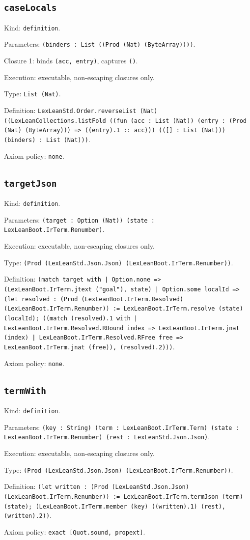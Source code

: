 \documentclass[11pt]{article}
\begin{document}
\subsection*{\texttt{caseLocals}}
\noindent Kind: \texttt{definition}.\par
\noindent Parameters: \texttt{(binders : List ((Prod (Nat) (ByteArray))))}.\par
\noindent Closure 1: binds \texttt{(acc, entry)}, captures \texttt{()}.\par
\noindent Execution: executable, non-escaping closures only.\par
\noindent Type: \texttt{List (Nat)}.\par
\noindent Definition: \texttt{LexLeanStd.Order.reverseList (Nat) ((LexLeanCollections.listFold ((fun (acc : List (Nat)) (entry : (Prod (Nat) (ByteArray))) => ((entry).1 :: acc))) (([] : List (Nat))) (binders) : List (Nat)))}.\par
\noindent Axiom policy: \texttt{none}.\par
\subsection*{\texttt{targetJson}}
\noindent Kind: \texttt{definition}.\par
\noindent Parameters: \texttt{(target : Option (Nat)) (state : LexLeanBoot.IrTerm.Renumber)}.\par
\noindent Execution: executable, non-escaping closures only.\par
\noindent Type: \texttt{(Prod (LexLeanStd.Json.Json) (LexLeanBoot.IrTerm.Renumber))}.\par
\noindent Definition: \texttt{(match target with | Option.none => (LexLeanBoot.IrTerm.jtext ("goal"), state) | Option.some localId => (let resolved : (Prod (LexLeanBoot.IrTerm.Resolved) (LexLeanBoot.IrTerm.Renumber)) := LexLeanBoot.IrTerm.resolve (state) (localId); ((match (resolved).1 with | LexLeanBoot.IrTerm.Resolved.RBound index => LexLeanBoot.IrTerm.jnat (index) | LexLeanBoot.IrTerm.Resolved.RFree free => LexLeanBoot.IrTerm.jnat (free)), (resolved).2)))}.\par
\noindent Axiom policy: \texttt{none}.\par
\subsection*{\texttt{termWith}}
\noindent Kind: \texttt{definition}.\par
\noindent Parameters: \texttt{(key : String) (term : LexLeanBoot.IrTerm.Term) (state : LexLeanBoot.IrTerm.Renumber) (rest : LexLeanStd.Json.Json)}.\par
\noindent Execution: executable, non-escaping closures only.\par
\noindent Type: \texttt{(Prod (LexLeanStd.Json.Json) (LexLeanBoot.IrTerm.Renumber))}.\par
\noindent Definition: \texttt{(let written : (Prod (LexLeanStd.Json.Json) (LexLeanBoot.IrTerm.Renumber)) := LexLeanBoot.IrTerm.termJson (term) (state); (LexLeanBoot.IrTerm.member (key) ((written).1) (rest), (written).2))}.\par
\noindent Axiom policy: \texttt{exact [Quot.sound, propext]}.\par
\end{document}
